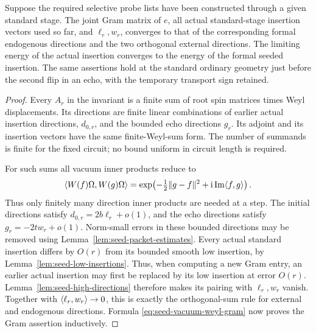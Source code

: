 \begin{lemma}
\label{lem:seed-gram-induction}
Suppose the required selective probe lists have been constructed through
a given standard stage.  The joint Gram matrix of \(e\), all actual
standard-stage insertion vectors used so far, and \(\ell_r,w_r\),
converges to that of the corresponding formal endogenous directions
and the two orthogonal external directions.  The limiting energy of the
actual insertion converges to the energy of the formal seeded insertion.
The same assertions hold at the standard ordinary geometry just before
the second flip in an echo, with the temporary transport sign retained.
\end{lemma}

\begin{proof}
Every \(A_r\) in the invariant is a finite sum of root spin matrices
times Weyl displacements.  Its directions are finite linear combinations
of earlier actual insertion directions, \(d_{0,r}\), and the bounded
echo directions \(g_r\).  Its adjoint and its insertion vectors have
the same finite-Weyl-sum form.  The number of summands is finite for the
fixed circuit; no bound uniform in circuit length is required.

For such sums all vacuum inner products reduce to
\begin{equation}
\label{eq:seed-vacuum-weyl-gram}
 \langle W(f)\Omega,W(g)\Omega\rangle
 =\exp\!\left(-\tfrac12\lVert g-f\rVert^2
                 +\mathrm i\operatorname{Im}\langle f,g\rangle\right).
\end{equation}
Thus only finitely many direction inner products are needed at a step.
The initial directions satisfy \(d_{0,r}=2b\ell_r+o(1)\), and the
echo directions satisfy \(g_r=-2tw_r+o(1)\).
Norm-small errors in these bounded directions may be removed using
Lemma~\ref{lem:seed-packet-estimates}.  Every actual standard insertion
differs by \(O(r)\) from its bounded smooth low insertion, by
Lemma~\ref{lem:seed-low-insertions}.  Thus, when computing a new Gram
entry, an earlier actual insertion may first be replaced by its low
insertion at error \(O(r)\).  Lemma~\ref{lem:seed-high-directions}
therefore makes its pairing with \(\ell_r,w_r\) vanish.  Together with
\(\langle \ell_r,w_r\rangle\to0\), this is exactly the orthogonal-sum rule
for external and endogenous directions.  Formula
\eqref{eq:seed-vacuum-weyl-gram} now proves the Gram assertion inductively.


\end{proof}

